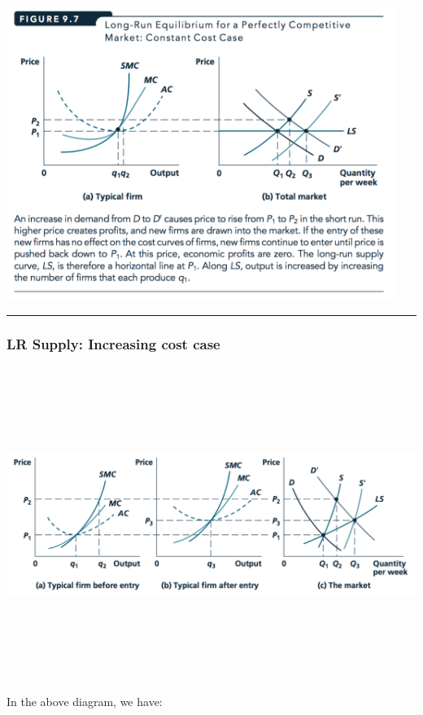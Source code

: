 \documentclass[]{article}
\begin{document}
\includegraphics[width=5in]{picsfigs/LR_constantcost.png}

\begin{center}\rule{0.5\linewidth}{\linethickness}\end{center}

\hypertarget{lr-supply-increasing-cost-case}{%
\subsubsection{LR Supply: Increasing cost
case}\label{lr-supply-increasing-cost-case}}

\includegraphics[height=4in]{picsfigs/incrcosts_lrsupply.png}

In the above diagram, we have:
\end{document}
